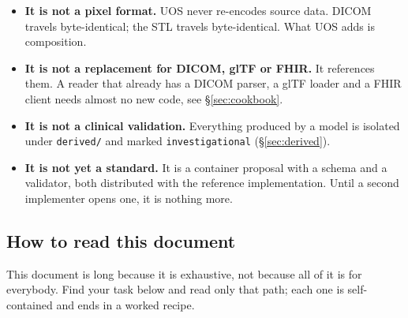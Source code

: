 \documentclass[11pt,a4paper]{article}
\newcommand{\code}[1]{\texttt{\small #1}}
\begin{document}
\begin{itemize}
  \item \textbf{It is not a pixel format.} UOS never re-encodes source data. DICOM travels
  byte-identical; the STL travels byte-identical. What UOS adds is composition.
  \item \textbf{It is not a replacement for DICOM, glTF or FHIR.} It references them. A
  reader that already has a DICOM parser, a glTF loader and a FHIR client needs almost no
  new code, see \S\ref{sec:cookbook}.
  \item \textbf{It is not a clinical validation.} Everything produced by a model is
  isolated under \code{derived/} and marked \code{investigational} (\S\ref{sec:derived}).
  \item \textbf{It is not yet a standard.} It is a container proposal with a schema
  and a validator, both distributed with the reference implementation. Until a second implementer opens one, it is nothing more.
\end{itemize}

\subsection{How to read this document}\label{sec:howtoread}

This document is long because it is exhaustive, not because all of it is for everybody.
Find your task below and read only that path; each one is self-contained and ends in a
worked recipe.
\end{document}
